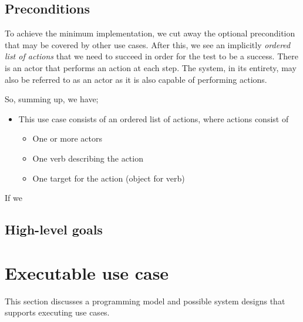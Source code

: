 \subsection{Preconditions}

To achieve the minimum implementation, we cut away the optional precondition that may be covered by other use cases. After this, we see an implicitly \emph{ordered list of actions} that we need to succeed in order for the test to be a success. There is an actor that performs an action at each step. The system, in its entirety, may also be referred to as an actor as it is also capable of performing actions.

So, summing up, we have;
\begin{itemize}
  \item This use case consists of an ordered list of actions, where actions consist of
  \begin{itemize}
	\item One or more actors
	\item One verb describing the action
	\item One target for the action (object for verb)
  \end{itemize}
\end{itemize}
If we 


\subsection{High-level goals}

\section{Executable use case}
This section discusses a programming model and possible system designs that supports executing use cases.

